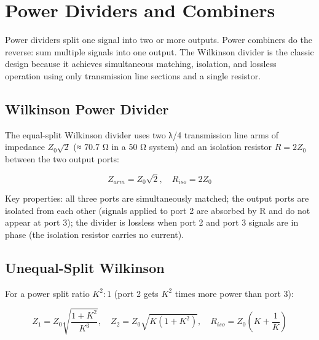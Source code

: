 \section{Power Dividers and Combiners}\label{sec:wiki_power_dividers}



Power dividers split one signal into two or more outputs. Power combiners do the reverse: sum multiple signals into one output. The Wilkinson divider is the classic design because it achieves simultaneous matching, isolation, and lossless operation using only transmission line sections and a single resistor.

      

\subsection{Wilkinson Power Divider}

      

The equal-split Wilkinson divider uses two λ/4 transmission line arms of impedance $Z_0\sqrt{2}$ (≈ 70.7 Ω in a 50 Ω system) and an isolation resistor $R = 2Z_0$ between the two output ports:


      
\[Z_{arm} = Z_0\sqrt{2}, \quad R_{iso} = 2Z_0\]

      

Key properties: all three ports are simultaneously matched; the output ports are isolated from each other (signals applied to port 2 are absorbed by R and do not appear at port 3); the divider is lossless when port 2 and port 3 signals are in phase (the isolation resistor carries no current).

      

\subsection{Unequal-Split Wilkinson}

      

For a power split ratio $K^2:1$ (port 2 gets $K^2$ times more power than port 3):

      
\[Z_1 = Z_0\sqrt{\dfrac{1+K^2}{K^3}}, \quad Z_2 = Z_0\sqrt{K(1+K^2)}, \quad R_{iso} = Z_0\!\left(K + \dfrac{1}{K}\right)\]

      

